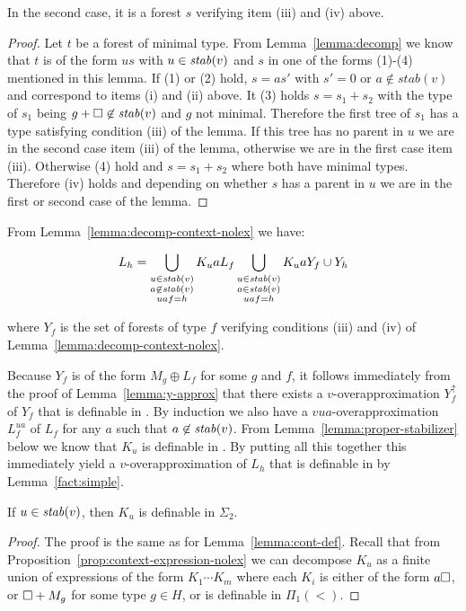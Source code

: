 \documentclass{LMCS}
\begin{document}
{\begin{lem}
\noindent
In the second case, it is a forest $s$ verifying item (iii) and (iv) above.
\end{lem}
\begin{proof}
  Let $t$ be a forest of minimal type. From Lemma~\ref{lemma:decomp} we know
  that $t$ is of the form $us$ with $u\in \mathit{stab}(v)$ and $s$ in one of the forms
  (1)-(4) mentioned in this lemma. If (1) or (2) hold, $s=as'$ with $s'=0$ or
  $a \not \in stab(v)$ and correspond to items (i) and (ii) above. It (3) holds
  $s=s_1+s_2$ with the type of $s_1$ being $g+\Box \not\in\mathit{stab}(v)$ and $g$ not
  minimal. Therefore the first tree of $s_1$ has a type satisfying condition
  (iii) of the lemma. If this tree has no parent in $u$ we are in the second
  case item (iii) of the lemma, otherwise we are in the first case item (iii).
  Otherwise (4) hold and $s=s_1+s_2$ where both have minimal types. Therefore
  (iv) holds and depending on whether $s$ has a parent in $u$ we are in the
  first or second case of the lemma.
\end{proof}

From Lemma~\ref{lemma:decomp-context-nolex} we have:

\[
L_h=\bigcup_{\substack{u \in \mathit{stab}(v)\\a\not\in\mathit{stab}(v)\\uaf=h}} K_uaL_f 
\bigcup_{\substack{u \in \mathit{stab}(v)\\a\in\mathit{stab}(v)\\uaf=h}} K_uaY_f \cup Y_h
\]

where $Y_f$ is the set of forests of type $f$ verifying conditions (iii) and
(iv) of Lemma~\ref{lemma:decomp-context-nolex}.

\noindent
Because $Y_f$ is of the form $M_g \oplus L_f$ for some $g$ and $f$, it follows
immediately from the proof of Lemma~\ref{lemma:y-approx} that there exists a
$v$-overapproximation $Y^\uparrow_f$ of $Y_f$ that is definable in \Stwo. By
induction we also have a $vua$-overapproximation $L^{ua}_f$ of $L_f$ for any
$a$ such that $a\not\in \mathit{stab}(v)$. From Lemma~\ref{lemma:proper-stabilizer}
below we know that $K_u$ is definable in \Stwo. By putting all this together
this immediately yield a $v$-overapproximation of $L_h$ that is definable in
\Stwo by Lemma~\ref{fact:simple}.

\begin{lem}  \label{lemma:proper-stabilizer}
If $u \in \mathit{stab}(v)$, then $K_u$ is definable in $\Sigma_2$.
\end{lem}
\begin{proof}
  The proof is the same as for Lemma~\ref{lemma:cont-def}.
  Recall that from Proposition~\ref{prop:context-expression-nolex} we can decompose
  $K_u$ as a finite union of expressions of the form $K_{1}
  \cdots K_{m}$ where each $K_{i}$ is either of the form $a\Box$, or $\Box +
  M_g$ for some type $g \in H$, or is definable in $\Pi_1(<)$.


\end{proof}}
\end{document}

